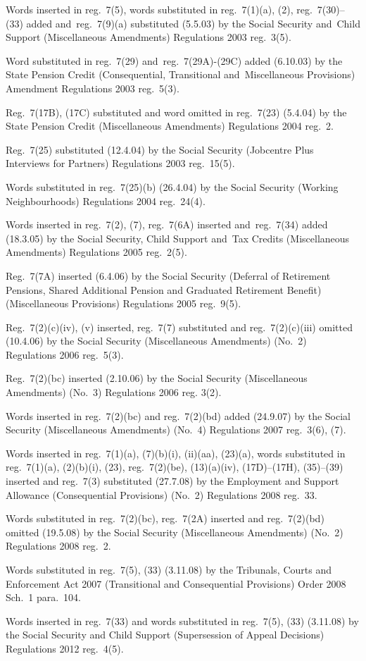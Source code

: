 \documentclass[12pt,a4paper]{article}
\begin{document}
{Words inserted in reg.~7(5), words substituted in reg.~7(1)(a), (2), reg.~7(30)--(33) added and~reg.~7(9)(a) substituted (5.5.03) by the Social Security and~Child Support (Miscellaneous Amendments) Regulations 2003 reg.~3(5).

Word substituted in reg.~7(29) and~reg.~7(29A)-(29C) added (6.10.03) by the State Pension Credit (Consequential, Transitional and~Miscellaneous Provisions) Amendment Regulations 2003 reg.~5(3).

Reg.~7(17B), (17C) substituted and word omitted in reg.~7(23) (5.4.04) by the State Pension Credit (Miscellaneous Amendments) Regulations 2004 reg.~2.

Reg.~7(25) substituted (12.4.04) by the Social Security (Jobcentre Plus Interviews for Partners) Regulations 2003 reg.~15(5).

Words substituted in reg.~7(25)(b) (26.4.04) by the Social Security (Working Neighbourhoods) Regulations 2004 reg.~24(4).

Words inserted in reg.~7(2), (7), reg.~7(6A) inserted and~reg.~7(34) added (18.3.05) by the Social Security, Child Support and~Tax Credits (Miscellaneous Amendments) Regulations 2005 reg.~2(5).

Reg.~7(7A) inserted (6.4.06) by the Social Security (Deferral of Retirement Pensions, Shared Additional Pension and Graduated Retirement Benefit) (Miscellaneous Provisions) Regulations 2005 reg.~9(5).

Reg.~7(2)(c)(iv), (v) inserted, reg.~7(7) substituted and reg.~7(2)(c)(iii) omitted (10.4.06) by the Social Security (Miscellaneous Amendments) (No.~2) Regulations 2006 reg.~5(3).

Reg.~7(2)(bc) inserted (2.10.06) by the Social Security (Miscellaneous Amendments) (No.~3) Regulations 2006 reg. 3(2).

Words inserted in reg.~7(2)(bc) and reg.~7(2)(bd) added (24.9.07) by the Social Security (Miscellaneous Amendments) (No.~4) Regulations 2007 reg.~3(6), (7).

\begin{sloppypar}
Words inserted in reg.~7(1)(a), (7)(b)(i), (ii)(aa), (23)(a), words substituted in reg.~7(1)(a), (2)(b)(i), (23), reg.~7(2)(be), (13)(a)(iv), (17D)--(17H), (35)--(39) inserted and reg.~7(3) substituted (27.7.08) by the Employment and Support Allowance (Consequential Provisions) (No.~2) Regulations 2008 reg.~33.
\end{sloppypar}

Words substituted in reg.~7(2)(bc), reg.~7(2A) inserted and reg.~7(2)(bd) omitted (19.5.08) by the Social Security (Miscellaneous Amendments) (No.~2) Regulations 2008 reg.~2.

Words substituted in reg.~7(5), (33) (3.11.08) by the Tribunals, Courts and Enforcement Act 2007 (Transitional and Consequential Provisions) Order 2008 Sch.~1 para.~104.

Words inserted in reg.~7(33) and words substituted in reg.~7(5), (33) (3.11.08) by the Social Security and Child Support (Supersession of Appeal Decisions) Regulations 2012 reg.~4(5).
}
\end{document}
